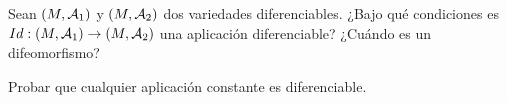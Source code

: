 \documentclass[twoside]{article}
\begin{document}
\newpage

\begin{ejercicio}{5}
Sean $(M,\mathcal{A}_1)$ y $(M,\mathcal{A}_2)$ dos variedades diferenciables. ¿Bajo qué condiciones
es $Id : (M,\mathcal{A}_1) \to (M,\mathcal{A}_2)$ una aplicación diferenciable? ¿Cuándo es un
difeomorfismo?
\end{ejercicio}
\begin{solucion}

\end{solucion}

\newpage

\begin{ejercicio}{6}
Probar que cualquier aplicación constante es diferenciable.
\end{ejercicio}
\begin{solucion}

\end{solucion}
\end{document}
